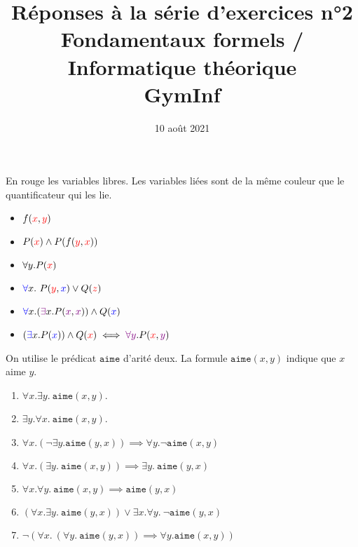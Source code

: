 \documentclass[12pt,french,a4paper]{article}
\begin{document}
\title{\vspace{-2cm}Réponses à la série d'exercices n°2\\\large{Fondamentaux formels / Informatique théorique\\GymInf}}
\date{\vspace{-1cm}10 août 2021}

\maketitle

\begin{question}
En rouge les variables libres. Les variables liées sont de la même couleur que le quantificateur qui les lie.

\begin{itemize}
\item $f(\textcolor{red}{x}, \textcolor{red}{y})$
\item $P(\textcolor{red}{x}) \wedge P(f(\textcolor{red}{y}, \textcolor{red}{x}))$
\item $\forall y. P(\textcolor{red}{x})$
\item $\textcolor{blue}{\forall} x.\ P(\textcolor{red}{y}, \textcolor{blue}{x}) \vee Q(\textcolor{red}{z})$
\item $\textcolor{blue}{\forall} x. (\textcolor{violet}{\exists} x. P(\textcolor{violet}{x}, \textcolor{violet}{x})) \wedge Q(\textcolor{blue}{x})$
\item $(\textcolor{blue}{\exists} x. P(\textcolor{blue}{x})) \wedge Q(\textcolor{red}{x}) \iff \textcolor{violet}{\forall y}. P(\textcolor{red}{x}, \textcolor{violet}{y})$
\end{itemize}
\end{question}


\begin{question}
On utilise le prédicat $\texttt{aime}$ d'arité deux. La formule $\texttt{aime}(x, y)$ indique que $x$ aime $y$.
\begin{enumerate}
\item $\forall x. \exists y.\ \texttt{aime}(x, y)$.
\item $\exists y. \forall x.\ \texttt{aime}(x, y)$.
\item $\forall x. (\neg \exists y. \texttt{aime}(y, x)) \implies \forall y. \neg \texttt{aime}(x, y)$
\item $\forall x. (\exists y.\ \texttt{aime}(x, y)) \implies \exists y.\ \texttt{aime}(y, x)$
\item $\forall x. \forall y.\ \texttt{aime}(x, y) \implies \texttt{aime}(y, x)$
\item $(\forall x. \exists y.\ \texttt{aime}(y, x)) \vee \exists x. \forall y.\ \neg \texttt{aime}(y, x)$
\item $\neg (\forall x.\ (\forall y.\ \texttt{aime}(y, x)) \implies \forall y. \texttt{aime}(x, y))$
\end{enumerate}
\end{question}
\end{document}
